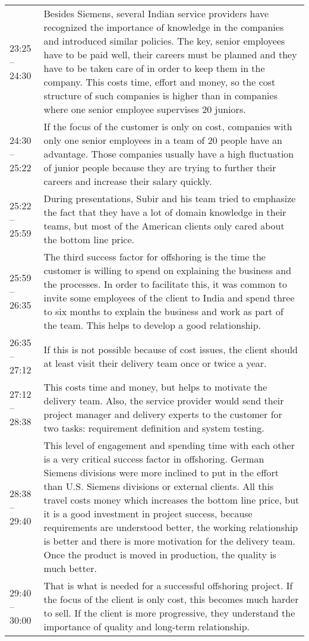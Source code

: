 \begin{appendix}
\begin{longtable}{l p{12.5cm}}
	23:25 -- 24:30&Besides Siemens, several Indian service providers have recognized the importance of knowledge in the companies and introduced similar policies. The key, senior employees have to be paid well, their careers must be planned and they have to be taken care of in order to keep them in the company. This costs time, effort and money, so the cost structure of such companies is higher than in companies where one senior employee supervises 20 juniors.\\
	24:30 -- 25:22&If the focus of the customer is only on cost, companies with only one senior employees in a team of 20 people have an advantage. Those companies usually have a high fluctuation of junior people because they are trying to further their careers and increase their salary quickly.\\
	25:22 -- 25:59&During presentations, Subir and his team tried to emphasize the fact that they have a lot of domain knowledge in their teams, but most of the American clients only cared about the bottom line price.\\
	25:59 -- 26:35&The third success factor for offshoring is the time the customer is willing to spend on explaining the business and the processes. In order to facilitate this, it was common to invite some employees of the client to India and spend three to six months to explain the business and work as part of the team. This helps to develop a good relationship.\\
	26:35 -- 27:12& If this is not possible because of cost issues, the client should at least visit their delivery team once or twice a year.\\
	27:12 -- 28:38 &This costs time and money, but helps to motivate the delivery team. Also, the service provider would send their project manager and delivery experts to the customer for two tasks: requirement definition and system testing.\\
	28:38 -- 29:40&This level of engagement and spending time with each other is a very critical success factor in offshoring. German Siemens divisions were more inclined to put in the effort than U.S. Siemens divisions or external clients. All this travel costs money which increases the bottom line price, but it is a good investment in project success, because requirements are understood better, the working relationship is better and there is more motivation for the delivery team. Once the product is moved in production, the quality is much better.\\
	29:40 -- 30:00&That is what is needed for a successful offshoring project. If the focus of the client is only cost, this becomes much harder to sell. If the client is more progressive, they understand the importance of quality and long-term relationship.\\

\end{longtable}
\end{appendix}
